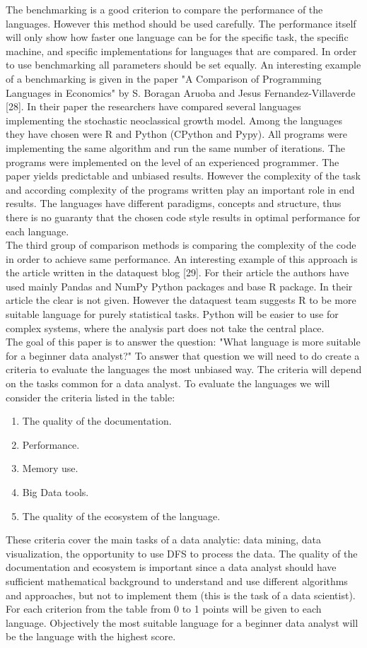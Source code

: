 \documentclass [twoside,
  11pt, a4paper,
  footinclude=true,
  headinclude=true,
  cleardoublepage=empty
]{article}
\begin{document}
The benchmarking is a good criterion to compare the performance of the languages. However this method should be used carefully. The performance itself will only show how faster one language can be for the specific task, the specific machine, and specific implementations for languages that are compared. In order to use benchmarking all parameters should be set equally. An interesting example of a benchmarking is given in the paper "A Comparison of Programming Languages in Economics" by S. Boragan Aruoba and Jesus Fernandez-Villaverde [28]. In their paper the researchers have compared several languages implementing the stochastic neoclassical growth model. Among the languages they have chosen were R and Python (CPython and Pypy). All programs were implementing the same algorithm and run the same number of iterations. The programs were implemented on the level of an experienced programmer. The paper yields predictable and unbiased results. However the complexity of the task and according complexity of the programs written play an important role in end results. The languages have different paradigms, concepts and structure, thus there is no guaranty that the chosen code style results in optimal performance for each language.\\
The third group of comparison methods is comparing the complexity of the code in order to achieve same performance. An interesting example of this approach is the article written in the dataquest blog [29]. For their article the authors have used mainly Pandas and NumPy Python packages and base R package. In their article the clear is not given. However the dataquest team suggests R to be more suitable language for purely statistical tasks. Python will be easier to use for complex systems, where the analysis part does not take the central place.\\
The goal of this paper is to answer the question: "What language is more suitable for a beginner data analyst?" To answer that question we will need to do create a criteria to evaluate the languages the most unbiased way. The criteria will depend on the tasks common for a data analyst. To evaluate the languages we will consider the criteria listed in the table:
\begin{enumerate}
    \item The quality of the documentation. 
    \item Performance.
    \item Memory use.
    \item Big Data tools.
    \item The quality of the ecosystem of the language.
\end{enumerate}
These criteria cover the main tasks of a data analytic: data mining, data visualization, the opportunity to use DFS to process the data. The quality of the documentation and ecosystem is important since a data analyst should have sufficient mathematical background to understand and use different algorithms and approaches, but not to implement them (this is the task of a data scientist).\\
For each criterion from the table from 0 to 1 points will be given to each language. Objectively the most suitable language for a beginner data analyst will be the language with the highest score.
\end{document}
